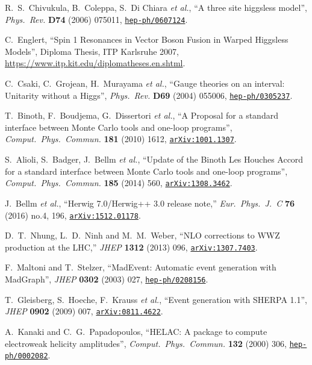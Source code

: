\documentclass[english,12pt]{article}
\begin{document}
\begin{thebibliography}{10}
  R.~S.~Chivukula, B.~Coleppa, S.~Di Chiara {\it et al.},
  ``{A three site higgsless model}'',
  {\em Phys.\ Rev.} {\bf D74} (2006) 075011,
\href{https://www.arXiv.org/abs/hep-ph/0607124}{{\tt hep-ph/0607124}}.
  
C.~Englert, ``Spin 1 Resonances in Vector Boson Fusion in Warped Higgsless
  Models'', {Diploma Thesis, ITP Karlsruhe 2007}, {\url{https://www.itp.kit.edu/diplomatheses.en.shtml}}.

C.~Csaki, C.~Grojean, H.~Murayama {\it et al.}, ``{Gauge theories
  on an interval: Unitarity without a Higgs}'', {\em Phys.\ Rev.} {\bf D69}
  (2004) 055006,
\href{https://www.arXiv.org/abs/hep-ph/0305237}{{\tt hep-ph/0305237}}.

  T.~Binoth, F.~Boudjema, G.~Dissertori {\it et al.},
  ``{A Proposal for a standard interface between Monte Carlo tools and one-loop programs}'',
  {\em Comput.\ Phys.\ Commun.}  {\bf 181} (2010) 1612,
  \href{https://arxiv.org/abs/1001.1307}{{\tt arXiv:1001.1307}}.

  S.~Alioli, S.~Badger, J.~Bellm {\it et al.},
  ``{Update of the Binoth Les Houches Accord for a standard interface between Monte Carlo tools and one-loop programs}'',
  {\em Comput.\ Phys.\ Commun.}  {\bf 185} (2014) 560,
  \href{https://arxiv.org/abs/1308.3462}{{\tt arXiv:1308.3462}}.

  J.~Bellm {\it et al.},
  ``Herwig 7.0/Herwig++ 3.0 release note,''
  {\em Eur.\ Phys.\ J.\ C} {\bf 76} (2016) no.4,  196,
  \href{https://arxiv.org/abs/1512.01178}{{\tt arXiv:1512.01178}}.

  D.~T.~Nhung, L.~D.~Ninh and M.~M.~Weber,
  ``NLO corrections to WWZ production at the LHC,''
  {\em JHEP } {\bf 1312} (2013) 096,
\href{https://www.arXiv.org/abs/1307.7403}{{\tt arXiv:1307.7403}}.

F.~Maltoni and T.~Stelzer, ``{MadEvent: Automatic event generation with
  MadGraph}'', {\em JHEP} {\bf 0302} (2003) 027,
\href{https://www.arXiv.org/abs/hep-ph/0208156}{{\tt hep-ph/0208156}}.

  T.~Gleisberg, S.~Hoeche, F.~Krauss {\it et al.},
  ``{Event generation with SHERPA 1.1}'',
  {\em JHEP} {\bf 0902} (2009)  007,
\href{https://www.arXiv.org/abs/0811.4622}{{\tt arXiv:0811.4622}}.

A.~Kanaki and C.~G.~Papadopoulos, 
``{HELAC: A package to compute electroweak helicity amplitudes}'',
{\em Comput.\ Phys.\ Commun.} {\bf 132} (2000) 306,
\href{https://www.arXiv.org/abs/hep-ph/0002082}{{\tt hep-ph/0002082}}.


\end{thebibliography}
\end{document}
